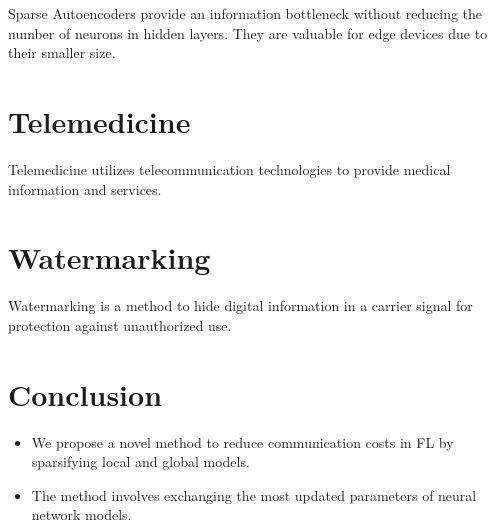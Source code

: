 \documentclass{article}
\begin{document}
Sparse Autoencoders provide an information bottleneck without reducing the number of neurons in hidden layers. They are valuable for edge devices due to their smaller size.

\section{Telemedicine}

Telemedicine utilizes telecommunication technologies to provide medical information and services.

\section{Watermarking}

Watermarking is a method to hide digital information in a carrier signal for protection against unauthorized use.

\section{Conclusion}

\begin{itemize}
\item We propose a novel method to reduce communication costs in FL by sparsifying local and global models.
\item The method involves exchanging the most updated parameters of neural network models.
\end{itemize}
\end{document}
